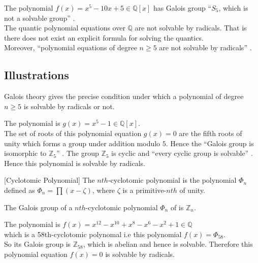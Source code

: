 The polynomial \(f(x)=x^5-10x+5 \in \mathbb{Q}[x]\) has Galois group ``\(S_5\), which is not a solvable group'' \cite{hunger}. \\[3mm]
The quantic polynomial equations over \(\mathbb{Q}\) are not solvable by radicals. That is there does not exist an explicit formula for solving the quantics. \\
Moreover, ``polynomial equations of degree \(n \geq 5\) are not solvable by radicals'' \cite{hunger}.

\subsection{Illustrations}
Galois theory gives the precise condition under which a polynomial of degree \(n \geq 5\) is solvable by radicals or not.

\vspace{5mm}
\begin{example}
  The polynomial is \(g(x)=x^5-1 \in \mathbb{Q}[x]\).\\
  The set of  roots of this polynomial equation \(g(x)=0\) are the fifth roots of unity which forms a group under addition modulo \(5\). Hence the ``Galois group is isomorphic to \(\mathbb{Z}_5\)'' \cite{hunger}. The group \(\mathbb{Z}_5\) is cyclic and ``every cyclic group is solvable'' \cite{galois}. Hence this polynomial is solvable by radicals.
\end{example}

\vspace{3mm}
\begin{definition} \cite{galois} [Cyclotomic Polynomial]
  The \(nth\)-cyclotomic polynomial is the polynomial \({\Phi}_n\) defined as \({\Phi}_n= \prod {(x-\zeta)}\), where \(\zeta\) is a primitive-\(nth\) of unity.
\end{definition}

\vspace{3mm}
\begin{theorem} \cite{galois}
  The Galois group of a \(nth\)-cyclotomic polynomial \({\Phi}_n\) of is \(\mathbb{Z}_n\).
\end{theorem}

\vspace{3mm}
\begin{example}
The polynomial is \(f(x)=x^{12}-x^{10}+x^8-x^6-x^2+1 \in \mathbb{Q}\)\\
which is a 58th-cyclotomic polynomal i.e this polynomial \(f(x)={\Phi}_{58}\).\\
  So its Galois group is \(\mathbb{Z}_{58}\), which is abelian and hence is solvable. Therefore this polynomial equation \(f(x)=0\) is solvable by radicals.
\end{example}


